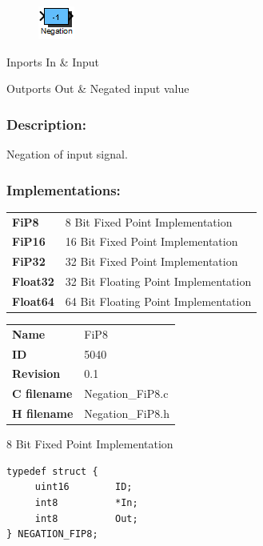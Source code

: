 \label{block:Negation}
\begin{figure}[H]\includegraphics{Negation}\end{figure} 

\begin{XtoCtabular}{Inports}
In & Input\tabularnewline
\hline
\end{XtoCtabular}


\begin{XtoCtabular}{Outports}
Out & Negated input value\tabularnewline
\hline
\end{XtoCtabular}

\subsubsection*{Description:}
Negation of input signal.


\subsubsection*{Implementations:}
\begin{tabular}{l l}
\textbf{FiP8} & 8 Bit Fixed Point Implementation\tabularnewline
\textbf{FiP16} & 16 Bit Fixed Point Implementation\tabularnewline
\textbf{FiP32} & 32 Bit Fixed Point Implementation\tabularnewline
\textbf{Float32} & 32 Bit Floating Point Implementation\tabularnewline
\textbf{Float64} & 64 Bit Floating Point Implementation\tabularnewline
\end{tabular}

\nopagebreak[0]
\begin{tabular}{l l}
\textbf{Name} & FiP8 \tabularnewline
\textbf{ID} & 5040 \tabularnewline
\textbf{Revision} & 0.1 \tabularnewline
\textbf{C filename} & Negation\_FiP8.c \tabularnewline
\textbf{H filename} & Negation\_FiP8.h \tabularnewline
\end{tabular}
\vspace{1ex}

8 Bit Fixed Point Implementation

\begin{lstlisting}
typedef struct {
     uint16        ID;
     int8          *In;
     int8          Out;
} NEGATION_FIP8;
\end{lstlisting}

